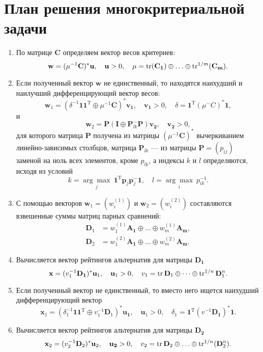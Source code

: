 \documentclass[specialist,
	substylefile = spbu.rtx,
	subf,href,colorlinks=true, 12pt]{disser}
\begin{document}
\section{План решения многокритериальной задачи}
\begin{enumerate}
	\item По матрице $\mathbf{C}$ определяем вектор весов критериев:
	      \[
		      \mathbf{w} = (\mu^{-1}\mathbf{C})^*\mathbf{u},\quad  \mathbf{u} > 0,\quad \mu = \operatorname{tr}(\mathbf{C_1}) \oplus\ldots\oplus \operatorname{tr}^{1/m}(\mathbf{C_m}).
	      \]
	\item Если полученный вектор $\mathbf{w}$ не единственный, то находятся наихудший и наилучший дифференцирующий вектор весов:
	      \[
		      \mathbf{w}_1 = (\delta^{-1}\mathbf{11}^\mathrm{T} \oplus \mu^{-1}\mathbf{C})^*\mathbf{v_1},\quad  \mathbf{v_1} > 0,\quad \delta = \mathbf{1}^\mathrm{T}(\mu^{-}C)^*\mathbf{1},
	      \]
	      и
	      \[
		      \mathbf{w}_2 =\mathbf{P}(\mathbf{I}\oplus\mathbf{P}^{-}_{lk}\mathbf{P})\mathbf{v_2},\quad \mathbf{v_2} > 0,
	      \]
	      для которого матрица $\mathbf{P}$ получена из матрицы $(\mu^{-1}\mathbf{C})^*$ вычеркиванием линейно-зависимых столбцов, матрица $\mathbf{P}_{lk}$ --- из матрицы $\mathbf{P} = (p_{ij})$ заменой на ноль всех элементов, кроме $p_{lk}$, а индексы $k$ и $l$ определяются, исходя из условий
	      \[
		      k = \underset{j}{\arg\max}~\mathbf{1}^\mathrm{T}\mathbf{p}_j\mathbf{p}^-_j\mathbf{1},\quad l = \underset{i}{\arg\max} ~p^{-1}_{ik}.
	      \]
	\item С помощью векторов $\mathbf{w}_1 = (w^{(1)}_i)$ и $\mathbf{w}_2 = (w^{(2)}_i)$ составляются взвешенные
	      суммы матриц парных сравнений:
	      \begin{align*}
		      \mathbf{D}_1 & = w^{(1)}_1\mathbf{A_1}\oplus\ldots\oplus w^{(1)}_m\mathbf{A_m}, \\
		      \mathbf{D}_2 & =w^{(2)}_1\mathbf{A_1}\oplus\ldots\oplus w^{(2)}_m\mathbf{A_m}.
	      \end{align*}
	\item Вычисляется вектор рейтингов альтернатив для матрицы $\mathbf{D_1}$
	      \[
		      \mathbf{x} = (v^{-1}_1\mathbf{D_1})^*\mathbf{u}_1,\quad \mathbf{u}_1 > 0,\quad v_1 = \operatorname{tr}\mathbf{D}_1\oplus\dots\oplus \operatorname{tr}^{1/n}\mathbf{D}_1^n.
	      \]
	\item Если полученный вектор не единственный, то вместо него ищется наихудший дифференцирующий вектор
	      \[
		      \mathbf{x}_1 = (\delta^{-1}_1\mathbf{11}^\mathrm{T}\oplus v^{-1}_1\mathbf{D}_1)^*\mathbf{u_1},\quad \mathbf{u}_1 > 0,\quad \delta_1 = \mathbf{1}^\mathrm{T}(v^{-1}\mathbf{D_1})^*\mathbf{1}.
	      \]
	\item Вычисляется вектор рейтингов альтернатив для матрицы $\mathbf{D_2}$
	      \[
		      \mathbf{x}_2 = (v^{-1}_2\mathbf{D}_2)^*\mathbf{u}_2,\quad \mathbf{u_2} > 0,\quad v_2 = \operatorname{tr}\mathbf{D}_2\oplus\ldots\oplus\operatorname{tr}^{1/n}(\mathbf{D}^n_2).
	      \]


\end{enumerate}
\end{document}

